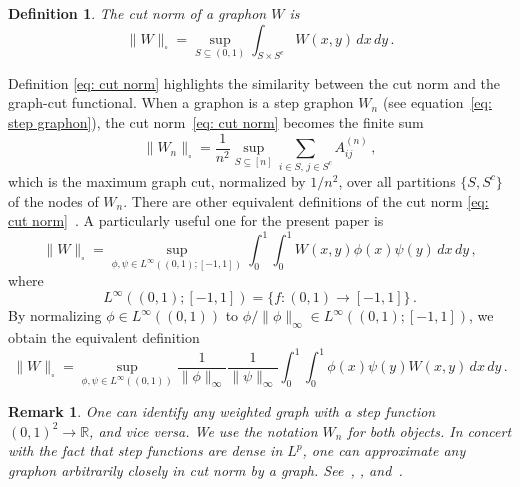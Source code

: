 \documentclass[11pt]{amsart}
\newtheorem{remark}{Remark}[section]
\newtheorem{definition}{Definition}[section]
\def\R{\mathbb{R}}
\def\ra{\rightarrow}
\numberwithin{equation}{section}
\begin{document}
\begin{definition}
    The \emph{cut norm} of a graphon $W$ is
\begin{equation} 
    \|W\|_\square = \sup_{S\subseteq (0,1)} \int_{S \times S^c} W(x,y)\,dx\,dy \,. 
\label{eq: cut norm} 
\end{equation}
\end{definition}


Definition \ref{eq: cut norm} highlights the similarity between the cut norm and the graph-cut functional. When a graphon is a step graphon $W_n$ (see equation~\eqref{eq: step graphon}), the cut norm~\eqref{eq: cut norm} becomes the finite sum
\begin{equation*}
	\|W_n\|_\square = \frac{1}{n^2} \sup_{S \subseteq [n]} \sum_{i\in S, \, j\in S^c} A^{(n)}_{ij} \,, 
\end{equation*}
which is the maximum {graph cut}, normalized by $1/n^2$, over all partitions $\{S, S^c\}$ of the nodes of $W_n$. There are other equivalent definitions of the cut norm \eqref{eq: cut norm}~\cite{janson2010graphons}. A particularly useful one for the present paper is
\begin{equation}
    \| W \|_\square = \sup_{\phi, \psi \in L^\infty((0,1);[-1,1])} \int_0^1 \int_0^1 W(x,y) {\phi}(x){\psi}(y)\,dx\,dy \,,
\label{eq: cut norm 1}
\end{equation}
where 
\begin{equation}
	L^\infty((0,1);[-1,1]) = \{f: (0,1) \ra [-1,1]\}\,.
\end{equation}
By normalizing $\phi \in L^\infty((0,1))$ to $\phi/\|\phi\|_\infty \in L^\infty((0,1);[-1,1])$, we obtain the equivalent definition
\begin{equation}
    \|W\|_\square = 
        {\sup_{\phi, \psi \in L^\infty((0,1))}}
        \frac{1}{\|\phi\|_\infty} \frac{1}{\|\psi\|_\infty} 
 \int_0^1 \int_0^1 \phi(x) \psi(y)W(x,y)\,dx\,dy \,.
\label{eq: cut norm 2}
\end{equation}


\begin{remark}\label{remark: identify W_n}
    One can identify any weighted graph with a step function $(0,1)^2 \ra \R$, and vice versa. We use the notation $W_n$ for both objects. 
    In concert with the fact that step functions are dense in $L^p$, one can approximate any graphon arbitrarily closely in cut norm by a graph. See~\cite[Section 3.3]{borgs2012convergent}, \cite[Remark 4.6]{janson2010graphons}, and~\cite{lovasz2007szemeredi}.
\end{remark}
\end{document}
